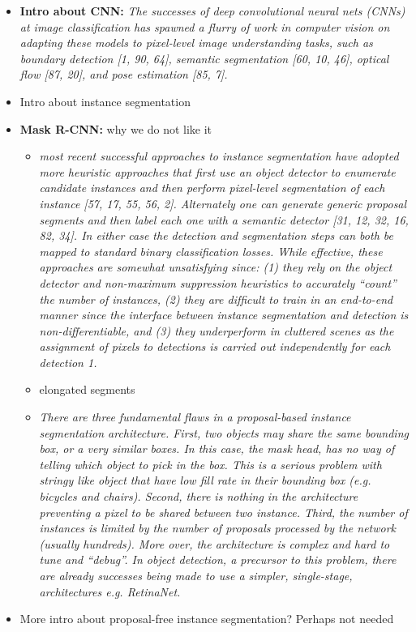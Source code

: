 \documentclass[10pt,twocolumn,letterpaper]{article}
\newcommand\SOURCE[1]{{\color{green}{(from: #1)}}}
\begin{document}
\begin{itemize}
\item \textbf{Intro about CNN:} \textit{The successes of deep convolutional neural nets (CNNs) at image classiﬁcation has spawned a ﬂurry of work in computer vision on adapting these models to pixel-level image understanding tasks, such as boundary detection [1, 90, 64], semantic segmentation [60, 10, 46], optical ﬂow [87, 20], and pose estimation [85, 7].} \SOURCE{Rec. embeddings}
\item Intro about instance segmentation
\item \textbf{Mask R-CNN:} why we do not like it 
\begin{itemize}
\item \textit{most recent successful approaches to instance segmentation have adopted more heuristic approaches that first use an object detector to enumerate candidate instances and then perform pixel-level segmentation of each instance [57, 17, 55, 56, 2]. Alternately one can generate generic proposal segments and then label each one with a semantic detector [31, 12, 32, 16, 82, 34]. In either case the detection and segmentation steps can both be mapped to standard binary classiﬁcation losses. While effective, these approaches are somewhat unsatisfying since: (1) they rely on the object detector and non-maximum suppression heuristics to accurately “count” the number of instances, (2) they are difﬁcult to train in an end-to-end manner since the interface between instance segmentation and detection is non-differentiable, and (3) they underperform in cluttered scenes as the assignment of pixels to detections is carried out independently for each detection 1.} \SOURCE{Rec. embeddings}
\item elongated segments
\item \textit{There are three fundamental flaws in a proposal-based instance segmentation architecture. First, two objects may share the same bounding box, or a very similar boxes. In this case, the mask head, has no way of telling which object to pick in the box. This is a serious problem with stringy like object that have low fill rate in their bounding box (e.g. bicycles and chairs). Second, there is nothing in the architecture preventing a pixel to be shared between two instance. Third, the number of instances is limited by the number of proposals processed by the network (usually hundreds). More over, the architecture is complex and hard to tune and “debug”. In object detection, a precursor to this problem, there are already successes being made to use a simpler, single-stage, architectures e.g. RetinaNet.}
\end{itemize}
\item More intro about proposal-free instance segmentation? Perhaps not needed


\end{itemize}
\end{document}

